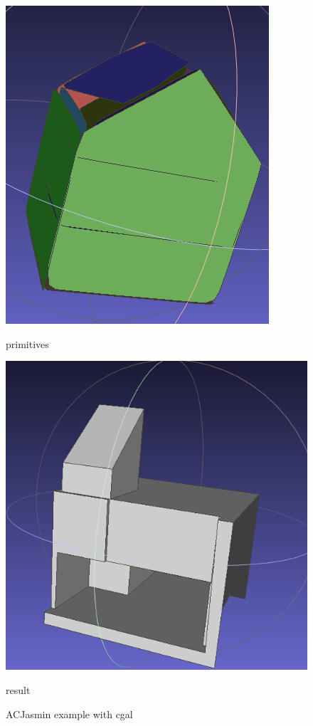 \documentclass{article}
\begin{document}
\begin{figure}[H]
\begin{minipage}[t]{0.29\textwidth}
    \includegraphics[width=\textwidth]{../../images/screen_kinetic/ACJasmin_primitive_cgal.png}
    \caption*{primitives}
  \end{minipage}
  \hspace{0.05\textwidth}
  \begin{minipage}[t]{0.27\textwidth}
    \includegraphics[width=\textwidth]{../../images/screen_kinetic/ACJasmin_result_CGAL.png}
    \caption*{result}
  \end{minipage}
  \caption{ACJasmin example with cgal}
\end{figure}  
\end{document}
